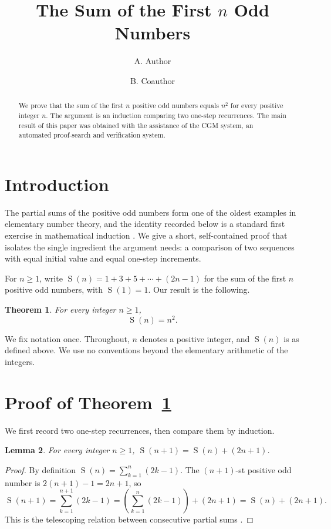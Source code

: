 \documentclass{amsart}
\title{The Sum of the First $n$ Odd Numbers}
\author{A. Author}
\author{B. Coauthor}
\date{}
\theoremstyle{plain}
\newtheorem{thm}{Theorem}[section]
\newtheorem{lem}[thm]{Lemma}
\theoremstyle{definition}
\theoremstyle{remark}
\DeclareMathOperator{\Oddsum}{S}
\begin{document}
\begin{abstract}
We prove that the sum of the first $n$ positive odd numbers equals $n^2$ for every positive integer $n$. The argument is an induction comparing two one-step recurrences. The main result of this paper was obtained with the assistance of the CGM system, an automated proof-search and verification system.
\end{abstract}

\maketitle

\section{Introduction}\label{sec:introduction}

The partial sums of the positive odd numbers form one of the oldest examples in elementary number theory, and the identity recorded below is a standard first exercise in mathematical induction \cite{Exm20}. We give a short, self-contained proof that isolates the single ingredient the argument needs: a comparison of two sequences with equal initial value and equal one-step increments.

For $n \ge 1$, write $\Oddsum(n) = 1 + 3 + 5 + \cdots + (2n-1)$ for the sum of the first $n$ positive odd numbers, with $\Oddsum(1) = 1$. Our result is the following.

\begin{thm}\label{thm:main}
For every integer $n \ge 1$,
\[
  \Oddsum(n) = n^2.
\]
\end{thm}

We fix notation once. Throughout, $n$ denotes a positive integer, and $\Oddsum(n)$ is as defined above. We use no conventions beyond the elementary arithmetic of the integers.

\section{Proof of Theorem~\ref{thm:main}}\label{sec:proof}

We first record two one-step recurrences, then compare them by induction.

\begin{lem}\label{lem:odd-recurrence}
For every integer $n \ge 1$, $\Oddsum(n+1) = \Oddsum(n) + (2n+1)$.
\end{lem}

\begin{proof}
By definition $\Oddsum(n) = \sum_{k=1}^{n} (2k-1)$. The $(n+1)$-st positive odd number is $2(n+1)-1 = 2n+1$, so
\[
  \Oddsum(n+1) = \sum_{k=1}^{n+1} (2k-1) = \left( \sum_{k=1}^{n} (2k-1) \right) + (2n+1) = \Oddsum(n) + (2n+1).
\]
This is the telescoping relation between consecutive partial sums \cite{AC24}.
\end{proof}
\end{document}
